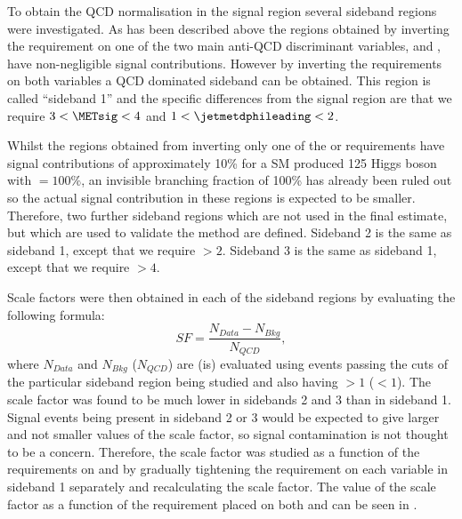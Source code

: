 To obtain the \ac{QCD} normalisation in the signal region several sideband regions were investigated. As has been described above the regions obtained by inverting the requirement on one of the two main anti-\ac{QCD} discriminant variables, \jetmetdphi and \METsig, have non-negligible signal contributions. However by inverting the requirements on both variables a \ac{QCD} dominated sideband can be obtained. This region is called ``sideband 1'' and the specific differences from the signal region are that we require $3<\METsig<4$ and $1<\jetmetdphileading<2$.  

Whilst the regions obtained from inverting only one of the \jetmetdphi or \METsig requirements have signal contributions of approximately 10\% for a \ac{SM} produced 125 \GeV Higgs boson with \BRinv$=100\%$, an invisible branching fraction of 100\% has already been ruled out so the actual signal contribution in these regions is expected to be smaller. Therefore, two further sideband regions which are not used in the final estimate, but which are used to validate the method are defined. Sideband 2 is the same as sideband 1, except that we require \jetmetdphileading$>2$. Sideband 3 is the same as sideband 1, except that we require \METsig$>4$. 



Scale factors were then obtained in each of the sideband regions by evaluating the following formula:
\begin{equation}
  SF=\frac{N_{Data}-N_{Bkg}}{N_{QCD}},
  \label{eq:parkedqcdscalefactor}
\end{equation}
where $N_{Data}$ and $N_{Bkg}$ ($N_{QCD}$) are (is)  evaluated using events passing the cuts of the particular sideband region being studied and also having \jetmetdphi$>1$ (\jetmetdphi$<1$). The scale factor was found to be much lower in sidebands 2 and 3 than in sideband 1. Signal events being present in sideband 2 or 3 would be expected to give larger and not smaller values of the scale factor, so signal contamination is not thought to be a concern. Therefore, the scale factor was studied as a function of the requirements on \jetmetdphileading and \METsig by gradually tightening the requirement on each variable in sideband 1 separately and recalculating the scale factor. The value of the scale factor as a function of the requirement placed on both \jetmetdphileading and \METsig can be seen in .


